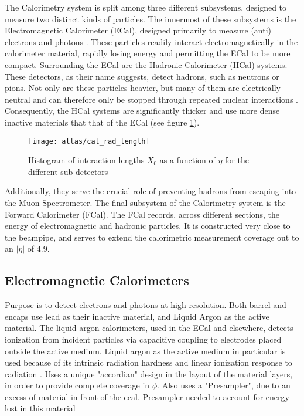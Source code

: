     The Calorimetry system is split among three different subsystems, designed to measure two distinct kinds of particles.
    The innermost of these subsystems is the Electromagnetic Calorimeter (ECal), designed primarily to measure (anti) electrons and photons \cite{calorimetry_lecture}.
    These particles readily interact electromagnetically in the calorimeter material, rapidly losing energy and permitting the ECal to be more compact.
    Surrounding the ECal are the Hadronic Calorimeter (HCal) systems.
    These detectors, as their name suggests, detect hadrons, such as neutrons or pions.
    Not only are these particles heavier, but many of them are electrically neutral and can therefore only be stopped through repeated nuclear interactions \cite{energy_measurement}.
    Consequently, the HCal systems are significantly thicker and use more dense inactive materials that that of the ECal (see figure \ref{fig:cal_rad_length}).
    \begin{figure}
        \texttt{[image: atlas/cal\_rad\_length]}
        \caption{Histogram of interaction lengths $X_0$ as a function of $\eta$ for the different sub-detectors \cite{atlas_tdr}}
        \label{fig:cal_rad_length}
    \end{figure}
    Additionally, they serve the crucial role of preventing hadrons from escaping into the Muon Spectrometer.
    The final subsystem of the Calorimetry system is the Forward Calorimeter (FCal).
    The FCal records, across different sections, the energy of electromagnetic and hadronic particles.
    It is constructed very close to the beampipe, and serves to extend the calorimetric measurement coverage out to an $|\eta|$ of 4.9.

    \subsection{Electromagnetic Calorimeters}
        Purpose is to detect electrons and photons at high resolution.
        Both barrel and encaps use lead as their inactive material, and Liquid Argon as the active material.
        The liquid argon calorimeters, used in the ECal and elsewhere, detects ionization from incident particles via capacitive coupling to electrodes placed outside the active medium.
        Liquid argon as the active medium in particular is used because of its intrinsic radiation hardness and linear ionization response to radiation \cite{Lar_cal_tdr}.
        Uses a unique "accordian" design in the layout of the material layers, in order to provide complete coverage in $\phi$.
        Also uses a "Presampler", due to an excess of material in front of the ecal.
        Presampler needed to account for energy lost in this material


